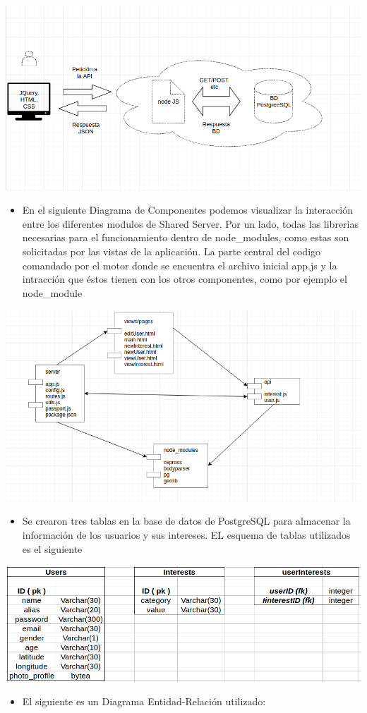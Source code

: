 \documentclass[letterpaper,10pt,english]{sphinxmanual}
\begin{document}
\includegraphics{esquemaShared.png}
\begin{itemize}
\item {} 
En el siguiente Diagrama de Componentes podemos visualizar la interacción entre los diferentes modulos de Shared Server. Por un lado, todas las librerias necesarias para el funcionamiento dentro de node\_modules, como estas son solicitadas por las vistas de la aplicación. La parte central del codigo comandado por el motor donde se encuentra el archivo inicial app.js y la intracción que éstos tienen con los otros componentes, como por ejemplo el node\_module

\end{itemize}

\includegraphics{componentes3Shared.png}
\begin{itemize}
\item {} 
Se crearon tres tablas en la base de datos de PostgreSQL para almacenar la información de los usuarios y sus intereses. EL esquema de tablas utilizados es el siguiente

\end{itemize}

\includegraphics{tablasShared.png}
\begin{itemize}
\item {} 
El siguiente es un Diagrama Entidad-Relación utilizado:

\end{itemize}
\end{document}
